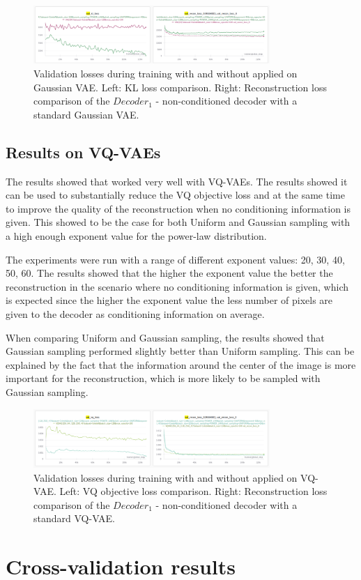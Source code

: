 \begin{figure}[H]
    \centering
    \includegraphics[width=0.8\textwidth]{figures/results/scvae1d/KL_and_recon.png}
    \caption[Validation loss during training with  applied on Gaussian VAE.]
    {
        Validation losses during training with and without  applied on Gaussian VAE.
        Left: KL loss comparison. Right: Reconstruction loss comparison of the $Decoder_1$ - non-conditioned decoder with a standard Gaussian VAE.
    }
    \label{fig:results_method2_gaussian_vae}
\end{figure}

\subsection{Results on VQ-VAEs}

The results showed that  worked very well with VQ-VAEs. The results showed it can be used to substantially reduce the VQ objective loss and at the same time to improve the quality of the reconstruction when no conditioning information is given. This showed to be the case for both Uniform and Gaussian sampling with a high enough exponent value for the power-law distribution.

The experiments were run with a range of different exponent values: 20, 30, 40, 50, 60. The results showed that the higher the exponent value the better the reconstruction in the scenario where no conditioning information is given, which is expected since the higher the exponent value the less number of pixels are given to the decoder as conditioning information on average.

When comparing Uniform and Gaussian sampling, the results showed that Gaussian sampling performed slightly better than Uniform sampling. This can be explained by the fact that the information around the center of the image is more important for the reconstruction, which is more likely to be sampled with Gaussian sampling.

\begin{figure}[H]
    \centering
    \includegraphics[width=0.8\textwidth]{figures/results/scvqvae1d/VQ_and_recon.png}
    \caption[Validation loss comparison during training of a VQ-VAE.]
    {
        Validation losses during training with and without  applied on VQ-VAE.
        Left: VQ objective loss comparison. Right: Reconstruction loss comparison of the $Decoder_1$ - non-conditioned decoder with a standard VQ-VAE.
    }
    \label{fig:results_method2_vq_vae}
\end{figure}

\section{Cross-validation results}

